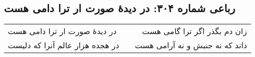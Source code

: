 \begin{center}
\section*{رباعی شماره ۳۰۴: در دیدهٔ صورت ار ترا دامی هست}
\label{sec:0304}
\begin{longtable}{l p{0.5cm} r}
در دیدهٔ صورت ار ترا دامی هست
&&
زان دم بگذر اگر ترا گامی هست
\\
در هجده هزار عالم آنرا که دلیست
&&
داند که نه جنبش و نه آرامی هست
\\
\end{longtable}
\end{center}
